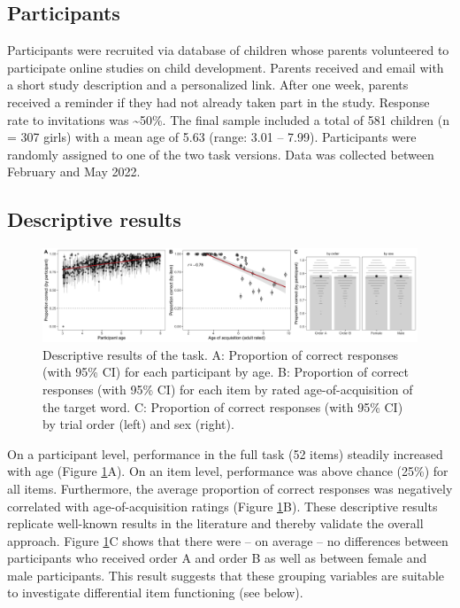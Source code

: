 \documentclass[
  man,floatsintext]{apa6}
\begin{document}
\hypertarget{participants}{%
\subsection{Participants}\label{participants}}

Participants were recruited via database of children whose parents volunteered to participate online studies on child development. Parents received and email with a short study description and a personalized link. After one week, parents received a reminder if they had not already taken part in the study. Response rate to invitations was \textasciitilde50\%. The final sample included a total of 581 children (n = 307 girls) with a mean age of 5.63 (range: 3.01 -- 7.99). Participants were randomly assigned to one of the two task versions. Data was collected between February and May 2022.

\hypertarget{descriptive-results}{%
\subsection{Descriptive results}\label{descriptive-results}}



\begin{figure}

{\centering \includegraphics[width=1\linewidth]{../graphs/data_fig} 

}

\caption{Descriptive results of the task. A: Proportion of correct responses (with 95\% CI) for each participant by age. B: Proportion of correct responses (with 95\% CI) for each item by rated age-of-acquisition of the target word. C: Proportion of correct responses (with 95\% CI) by trial order (left) and sex (right).}\label{fig:fig2}
\end{figure}

On a participant level, performance in the full task (52 items) steadily increased with age (Figure \ref{fig:fig2}A). On an item level, performance was above chance (25\%) for all items. Furthermore, the average proportion of correct responses was negatively correlated with age-of-acquisition ratings (Figure \ref{fig:fig2}B). These descriptive results replicate well-known results in the literature and thereby validate the overall approach. Figure \ref{fig:fig2}C shows that there were -- on average -- no differences between participants who received order A and order B as well as between female and male participants. This result suggests that these grouping variables are suitable to investigate differential item functioning (see below).
\end{document}
